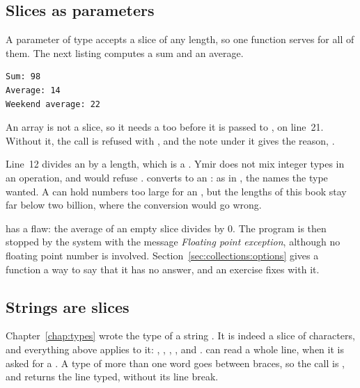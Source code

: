 \subsection{Slices as parameters}

A parameter of type \token{[i32]} accepts a slice of any length, so one function
serves for all of them. The next listing computes a sum and an average.


\vspace{-10pt}%
\begin{lstlisting}[style=bashVerb]
Sum: 98
Average: 14
Weekend average: 22
\end{lstlisting}

An array is not a slice, so it needs a  too before it is passed to
, on line~21. Without it, the call is refused with
, and the note under it gives the reason,
.

Line~12 divides an  by a length, which is a . Ymir does
not mix integer types in an operation, and would refuse .  converts  to an : as in
, the  names the type wanted. A  can hold
numbers too large for an , but the lengths of this book stay far
below two billion, where the conversion would go wrong.

 has a flaw: the average of an empty slice divides by 0. The
program is then stopped by the system with the message \textit{Floating point
  exception}, although no floating point number is involved.
Section~\ref{sec:collections:options} gives a function a way to say that it has
no answer, and an exercise fixes  with it.

\subsection{Strings are slices}

Chapter~\ref{chap:types} wrote the type of a string \token{[c8]}. It is indeed a
slice of characters, and everything above applies to it: ,
, \tokennolst{\mtildeascii{}}, \token{==}, and .
 can read a whole line, when it is asked for a \token{[c8]}. A type
of more than one word goes between braces, so the call is
, and returns the line typed, without its line break.

